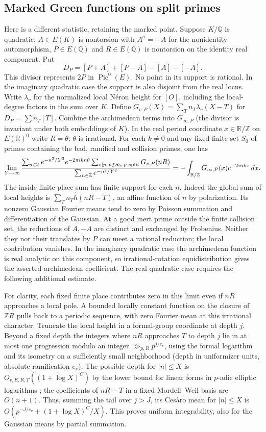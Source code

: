 \documentclass[11pt]{article}
\newcommand{\Q}{\mathbb Q}\newcommand{\Z}{\mathbb Z}\newcommand{\F}{\mathbb F}
\begin{document}
\subsection{Marked Green functions on split primes}
Here is a different statistic, retaining the marked point. Suppose $K/\Q$ is quadratic, $A\in E(K)$ is nontorsion with $A^\sigma=-A$ for the nonidentity automorphism, $P\in E(\Q)$ and $R\in E(\Q)$ is nontorsion on the identity real component. Put
\[
 D_P=[P+A]+[P-A]-[A]-[-A].
\]
This divisor represents $2P$ in $\operatorname{Pic}^0(E)$. No point in its support is rational. In the imaginary quadratic case the support is also disjoint from the real locus. Write $\lambda_v$ for the normalized local N\'eron height for $[O]$, including the local-degree factors in the sum over $K$. Define $G_{v,P}(X)=\sum_T n_T\lambda_v(X-T)$ for $D_P=\sum n_T[T]$. Combine the archimedean terms into $G_{\infty,P}$ (the divisor is invariant under both embeddings of $K$). In the real period coordinate $x\in\mathbb R/\Z$ on $E(\mathbb R)^0$ write $R=\theta$; $\theta$ is irrational. For each $k\ne0$ and any fixed finite set $S_0$ of primes containing the bad, ramified and collision primes, one has
\[
 \lim_{Y\to\infty}
 \frac{\sum_{n\in\Z}e^{-n^2/Y^2} e^{-2\pi i k n\theta}
  \sum_{v\mid p,\,p\notin S_0,\,p\ {\rm split}}G_{v,P}(nR)}
 {\sum_{n\in\Z}e^{-n^2/Y^2}}
 =-\int_{\mathbb R/\Z}G_{\infty,P}(x)e^{-2\pi i kx}\,dx .
\]
The inside finite-place sum has finite support for each $n$. Indeed the global sum of local heights is
$\sum_T n_T\widehat h(nR-T)$, an affine function of $n$ by polarization. Its nonzero Gaussian Fourier means tend to zero by Poisson summation and differentiation of the Gaussian. At a good inert prime outside the finite collision set, the reductions of $A,-A$ are distinct and exchanged by Frobenius. Neither they nor their translates by $P$ can meet a rational reduction; the local contribution vanishes. In the imaginary quadratic case the archimedean function is real analytic on this component, so irrational-rotation equidistribution gives the asserted archimedean coefficient. The real quadratic case requires the following additional estimate.

For clarity, each fixed finite place contributes zero in this limit even if $nR$ approaches a local pole. A bounded locally constant function on the closure of $\Z R$ pulls back to a periodic sequence, with zero Fourier mean at this irrational character. Truncate the local height in a formal-group coordinate at depth $j$. Beyond a fixed depth the integers where $nR$ approaches $T$ to depth $j$ lie in at most one progression modulo an integer $\gg_{p,R}p^{j/e_v}$, using the formal logarithm and its isometry on a sufficiently small neighborhood (depth in uniformizer units, absolute ramification $e_v$). The possible depth for $|n|\le X$ is $O_{v,E,R,T}((1+\log X)^C)$ by the lower bound for linear forms in $p$-adic elliptic logarithms \cite[Prop.~4.3]{BS}; the coefficients of $nR-T$ in a fixed Mordell--Weil basis are $O(n+1)$. Thus, summing the tail over $j>J$, its Ces\`aro mean for $|n|\le X$ is $O(p^{-J/e_v}+ (1+\log X)^C/X)$. This proves uniform integrability, also for the Gaussian means by partial summation.
\end{document}
